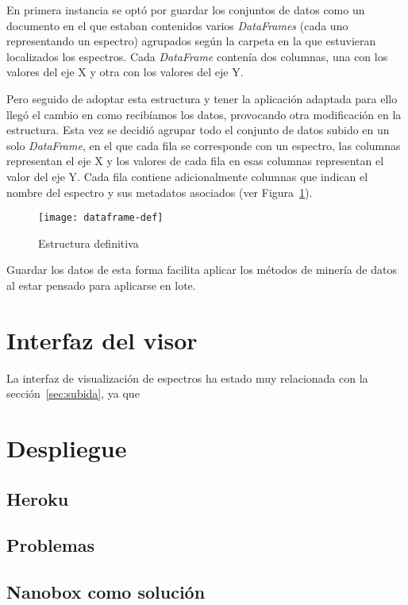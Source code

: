 En primera instancia se optó por guardar los conjuntos de datos como un
documento en el que estaban contenidos varios \textit{DataFrames} (cada uno
representando un espectro) agrupados según la carpeta en la que estuvieran
localizados los espectros. Cada \textit{DataFrame} contenía dos columnas, una
con los valores del eje X y otra con los valores del eje Y.

Pero seguido de adoptar esta estructura y tener la aplicación adaptada para ello
llegó el cambio en como recibíamos los datos, provocando otra modificación en la
estructura. Esta vez se decidió agrupar todo el conjunto de datos subido en un
solo \textit{DataFrame}, en el que cada fila se corresponde con un espectro, las
columnas representan el eje X y los valores de cada fila en esas columnas
representan el valor del eje Y. Cada fila contiene adicionalmente columnas que
indican el nombre del espectro y sus metadatos asociados (ver
Figura~\ref{fig:dataframe-def}).

\begin{figure}[!h]
	\centering
	\texttt{[image: dataframe-def]}
	\caption{Estructura definitiva}\label{fig:dataframe-def}
\end{figure}

Guardar los datos de esta forma facilita aplicar los métodos de minería de datos
al estar pensado para aplicarse en lote.

\section{Interfaz del visor}

La interfaz de visualización de espectros ha estado muy relacionada con la
sección~\ref{sec:subida}, ya que 

\section{Despliegue}\label{sec:despliegue}

\subsection{Heroku}

\subsection{Problemas}

\subsection{Nanobox como solución}

